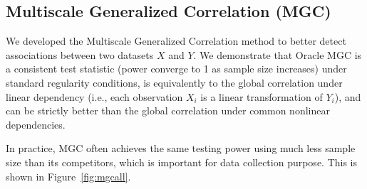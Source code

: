 \documentclass[simplex.tex]{subfiles}
\begin{document}
 
\subsection{Multiscale Generalized Correlation (MGC)}

We developed the Multiscale Generalized Correlation method to better detect associations between two datasets $X$ and $Y$. We demonstrate that Oracle MGC is a consistent test statistic (power converge to 1 as sample size increases) under standard regularity conditions, is equivalently to the global correlation under linear dependency (i.e., each observation $X_i$ is a linear transformation of $Y_i$), and can be strictly better than the global correlation under common nonlinear dependencies. 

In practice, MGC often achieves the same testing power using much less sample size than its competitors, which is important for data collection purpose. This is shown in Figure~\ref{fig:mgcall}.
%
\end{document}

